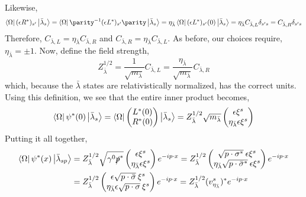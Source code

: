 \documentclass[12pt]{article}
\begin{document}
Likewise,
\[ \bra{\Omega} (\epsilon R^*)_{s'} \ket{{\bar{\lambda}}_{s}} = \bra{\Omega} \parity^{-1} (\epsilon L^*)_{s'} \parity  \ket{{\bar{\lambda}}_{s}} = \eta_{\bar{\lambda}} \bra{\Omega} (\epsilon L^*)_{s'}(0) \ket{{\bar{\lambda}}_{s}} = \eta_{\bar{\lambda}} C_{{\bar{\lambda}}, L} \delta_{s's} = C_{{\bar{\lambda}}, R} \delta_{s's} \]
Therefore, $C_{{\bar{\lambda}}, L} = \eta_{{\bar{\lambda}}} C_{{\bar{\lambda}}, R}$ and $C_{{\bar{\lambda}}, R} = \eta_{{\bar{\lambda}}} C_{{\bar{\lambda}}, L}$. As before, our choices require, $\eta_{{\bar{\lambda}}} = \pm 1$. Now, define the field strength,
\[ Z_{{\bar{\lambda}}}^{1/2} = \frac{1}{\sqrt{m_{\bar{\lambda}}}} C_{{\bar{\lambda}}, L} = \frac{\eta_{\bar{\lambda}}}{\sqrt{m_{\bar{\lambda}}}}  C_{{\bar{\lambda}}, R} \]
which, because the ${\bar{\lambda}}$ states are relativistically normalized, has the correct units.
Using this definition, we see that the entire inner product becomes,
\[ \left< \Omega \right| \psi^*(0) \left| {\bar{\lambda}}_s \right> = \left< \Omega \right|
\begin{pmatrix}
L^*(0) \\
R^*(0)
\end{pmatrix} \left| {\bar{\lambda}}_s \right> = Z_{{\bar{\lambda}}}^{1/2} \sqrt{m_{\bar{\lambda}}} 
\begin{pmatrix}
\epsilon \xi^s \\
\eta_{\bar{\lambda}} \epsilon \xi^s
\end{pmatrix} \]
Putting it all together, 
\begin{align*}  
\left< \Omega \right| \psi^*(x) \left| {\bar{\lambda}}_{s p} \right>
& = Z_{{\bar{\lambda}}}^{1/2} \sqrt{ \gamma^0 \slashed{p}^*}  \begin{pmatrix}
\epsilon \xi^s \\
\eta_{\bar{\lambda}} \epsilon \xi^s
\end{pmatrix} e^{- i p \cdot x} 
= Z_{{\bar{\lambda}}}^{1/2} 
\begin{pmatrix}
\sqrt{p \cdot \sigma^*} \: \epsilon \xi^s \\
\eta_{\bar{\lambda}} \sqrt{p \cdot \bar{\sigma}^*} \: \epsilon \xi^s
\end{pmatrix} 
e^{- i p \cdot x} 
\\
&= Z_{{\bar{\lambda}}}^{1/2} 
\begin{pmatrix}
\epsilon \sqrt{p \cdot \bar{\sigma}} \: \xi^s \\
\eta_{\bar{\lambda}} \epsilon \sqrt{p \cdot \sigma} \: \xi^s
\end{pmatrix} 
e^{- i p \cdot x} 
= Z_{{\bar{\lambda}}}^{1/2} (v^s_{\eta_{\bar{\lambda}}})^* e^{ -i p \cdot x} 
\end{align*}
\end{document}
